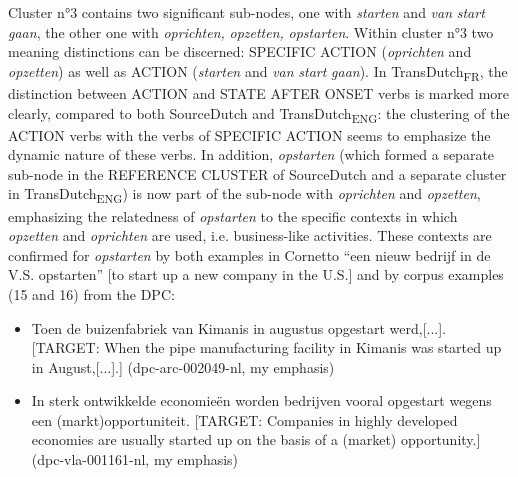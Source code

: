 Cluster n°3 contains two significant sub-nodes, one with \textit{starten} and \textit{van} \textit{start} \textit{gaan}, the other one with \textit{oprichten,} \textit{opzetten,} \textit{opstarten}. Within cluster n°3 two meaning distinctions can be discerned: {SPECIFIC} ACTION (\textit{oprichten} and \textit{opzetten}) as well as ACTION (\textit{starten} and \textit{van} \textit{start} \textit{gaan}). In TransDutch\textsubscript{FR}, the distinction between ACTION and STATE AFTER ONSET verbs is marked more clearly, compared to both SourceDutch and TransDutch\textsubscript{ENG}: the clustering of the ACTION verbs with the verbs of {SPECIFIC} ACTION seems to emphasize the dynamic nature of these verbs. In addition, \textit{opstarten} (which formed a separate sub-node in the REFERENCE CLUSTER of SourceDutch and a separate cluster in TransDutch\textsubscript{ENG}) is now part of the sub-node with \textit{oprichten} and \textit{opzetten}, emphasizing the relatedness of \textit{opstarten} to the specific contexts in which \textit{opzetten} and \textit{oprichten} are used, i.e. business-like activities. These contexts are confirmed for \textit{opstarten} by both examples in Cornetto “een nieuw bedrijf in de V.S. opstarten” [to start up a new company in the U.S.] and by corpus examples (15 and 16) from the DPC:

\begin{itemize}
\item \begin{styleVoorbeeld}
Toen de buizenfabriek van Kimanis in augustus opgestart werd,[...]. [TARGET: When the pipe manufacturing facility in Kimanis was started up in August,[...].] (dpc-arc-002049-nl, my emphasis)
\end{styleVoorbeeld}
\item \begin{styleVoorbeeld}
In sterk ontwikkelde economieën worden bedrijven vooral opgestart wegens een (markt)opportuniteit. [TARGET: Companies in highly developed economies are usually started up on the basis of a (market) opportunity.] (dpc-vla-001161-nl, my emphasis)
\end{styleVoorbeeld}
\end{itemize}

